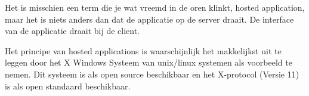 Het is misschien een term die je wat vreemd in de oren klinkt, hosted application, maar het is niets anders dan dat de applicatie op de server draait. De interface van de applicatie draait bij de client.

Het principe van hosted applications is waarschijnlijk het makkelijkst uit te leggen door het X Windows Systeem van unix/linux systemen als voorbeeld te nemen. Dit systeem is als open source beschikbaar en het X-protocol (Versie 11) is als open standaard beschikbaar.
